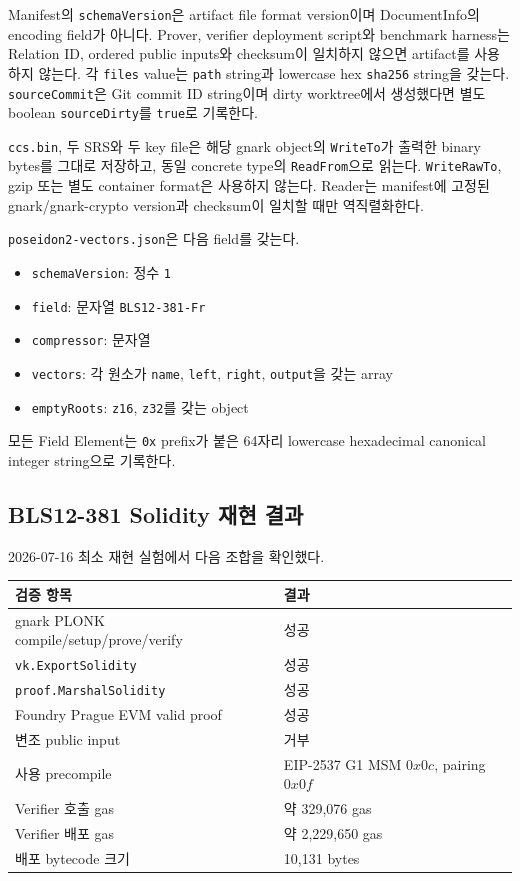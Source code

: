 \documentclass[11pt,a4paper]{extarticle}
\begin{document}
Manifest의 \texttt{schemaVersion}은 artifact file format version이며 DocumentInfo의
encoding field가 아니다. Prover, verifier deployment script와 benchmark harness는
Relation ID, ordered public inputs와 checksum이 일치하지 않으면 artifact를 사용하지 않는다.
각 \texttt{files} value는 \texttt{path} string과 lowercase hex
\texttt{sha256} string을 갖는다. \texttt{sourceCommit}은 Git commit ID string이며
dirty worktree에서 생성했다면 별도 boolean \texttt{sourceDirty}를 \texttt{true}로 기록한다.

\texttt{ccs.bin}, 두 SRS와 두 key file은 해당 gnark object의 \texttt{WriteTo}가 출력한
binary bytes를 그대로 저장하고, 동일 concrete type의 \texttt{ReadFrom}으로 읽는다.
\texttt{WriteRawTo}, gzip 또는 별도 container format은 사용하지 않는다. Reader는 manifest에
고정된 gnark/gnark-crypto version과 checksum이 일치할 때만 역직렬화한다.

\texttt{poseidon2-vectors.json}은 다음 field를 갖는다.

\begin{itemize}
  \item \texttt{schemaVersion}: 정수 \texttt{1}
  \item \texttt{field}: 문자열 \texttt{BLS12-381-Fr}
  \item \texttt{compressor}: 문자열 
  \item \texttt{vectors}: 각 원소가 \texttt{name}, \texttt{left}, \texttt{right},
        \texttt{output}을 갖는 array
  \item \texttt{emptyRoots}: \texttt{z16}, \texttt{z32}를 갖는 object
\end{itemize}

모든 Field Element는 \texttt{0x} prefix가 붙은 64자리 lowercase hexadecimal
canonical integer string으로 기록한다.

\subsection{BLS12-381 Solidity 재현 결과}

2026-07-16 최소 재현 실험에서 다음 조합을 확인했다.

\begin{center}
\begin{tabularx}{\textwidth}{@{}lX@{}}
\toprule
검증 항목 & 결과 \\
\midrule
gnark PLONK compile/setup/prove/verify & 성공 \\
\texttt{vk.ExportSolidity} & 성공 \\
\texttt{proof.MarshalSolidity} & 성공 \\
Foundry Prague EVM valid proof & 성공 \\
변조 public input & 거부 \\
사용 precompile & EIP-2537 G1 MSM $0x0c$, pairing $0x0f$ \\
Verifier 호출 gas & 약 329,076 gas \\
Verifier 배포 gas & 약 2,229,650 gas \\
배포 bytecode 크기 & 10,131 bytes \\
\bottomrule
\end{tabularx}
\end{center}
\end{document}
